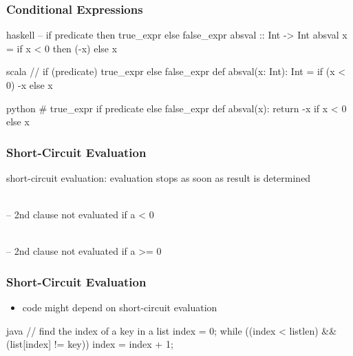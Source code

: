 \documentclass[dvipsnames]{beamer}
\theoremstyle{plain}
\begin{document}
\begin{frame}[fragile]
  \frametitle{Conditional Expressions}

  \begin{example}[Haskell]
    \begin{pygments}{haskell}
-- if predicate then true_expr else false_expr
absval :: Int -> Int
absval x = if x < 0 then (-x) else x
    \end{pygments}
  \end{example}

  \pause
  \begin{example}[Scala]
    \begin{pygments}{scala}
// if (predicate) true_expr else false_expr
def absval(x: Int): Int =
    if (x < 0) -x else x
    \end{pygments}
  \end{example}

  \pause
  \begin{example}[Python]
    \begin{pygments}{python}
# true_expr if predicate else false_expr
def absval(x):
    return -x if x < 0 else x
    \end{pygments}
  \end{example}
\end{frame}

\begin{frame}
  \frametitle{Short-Circuit Evaluation}

  \begin{definition}
    \alert{short-circuit evaluation}: evaluation stops
      as soon as result is determined
  \end{definition}

  \pause
  \begin{example}
    \\
    -- 2nd clause not evaluated if a < 0

    \bigskip
    \\
    -- 2nd clause not evaluated if a >= 0
  \end{example}
\end{frame}

\begin{frame}[fragile]
  \frametitle{Short-Circuit Evaluation}

  \begin{itemize}
    \item code might depend on short-circuit evaluation
  \end{itemize}

  \begin{example}[Java]
    \begin{pygments}{java}
// find the index of a key in a list
index = 0;
while ((index < listlen) && (list[index] != key))
    index = index + 1;
    \end{pygments}
  \end{example}
\end{frame}
\end{document}
